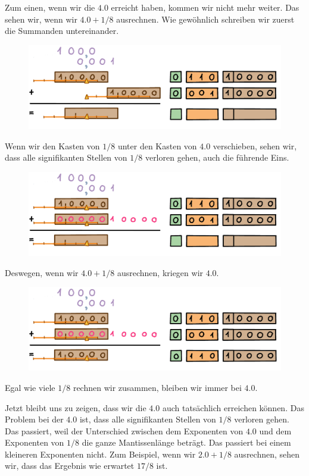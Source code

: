 Zum einen, wenn wir die \(4.0\) erreicht haben, kommen wir nicht mehr weiter.
Das sehen wir, wenn wir \(4.0 + 1/8\) ausrechnen. Wie gewöhnlich schreiben wir zuerst die Summanden untereinander.
\begin{figure}[H]
\centering
\includegraphics[width=\linewidth]{Pictures/Addition4and1-8_1.png}
\end{figure}
Wenn wir den Kasten von \(1/8\) unter den Kasten von \(4.0\) verschieben, sehen wir, dass alle signifikanten Stellen von \(1/8\) verloren gehen, auch die führende Eins.
\begin{figure}[H]
\centering
\includegraphics[width=\linewidth]{Pictures/Addition4and1-8_2.png}
\end{figure}
Deswegen, wenn wir \(4.0 + 1/8\) ausrechnen, kriegen wir \(4.0\).
\begin{figure}[H] 
\centering
\includegraphics[width=\linewidth]{Pictures/Addition4and1-8_3.png} 
\end{figure}
Egal wie viele \(1/8\) rechnen wir zusammen, bleiben wir immer bei \(4.0\).

Jetzt bleibt uns zu zeigen, dass wir die \(4.0\) auch tatsächlich erreichen können. Das Problem bei der \(4.0\) ist, dass alle signifikanten Stellen von \(1/8\) verloren gehen. Das passiert, weil der Unterschied zwischen dem Exponenten von \(4.0\) und dem Exponenten von \(1/8\) die ganze Mantissenlänge beträgt. Das passiert bei einem kleineren Exponenten nicht. Zum Beispiel, wenn wir \(2.0 + 1/8\) ausrechnen, sehen wir, dass das Ergebnis wie erwartet \(17/8\) ist.

